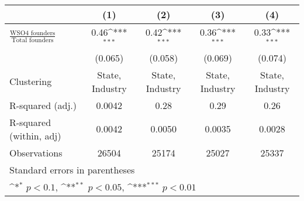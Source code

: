 {
\def\sym#1{\ifmmode^{#1}\else\(^{#1}\)\fi}
\begin{tabular}{l*{4}{c}}
\toprule
                    &\multicolumn{1}{c}{(1)}         &\multicolumn{1}{c}{(2)}         &\multicolumn{1}{c}{(3)}         &\multicolumn{1}{c}{(4)}         \\
\midrule
$\frac{\text{WSO4 founders}}{\text{Total founders}}$&        0.46\sym{***}&        0.42\sym{***}&        0.36\sym{***}&        0.33\sym{***}\\
                    &     (0.065)         &     (0.058)         &     (0.069)         &     (0.074)         \\
\midrule
Clustering          &State, Industry         &State, Industry         &State, Industry         &State, Industry         \\
R-squared (adj.)    &      0.0042         &        0.28         &        0.29         &        0.26         \\
R-squared (within, adj)&      0.0042         &      0.0050         &      0.0035         &      0.0028         \\
Observations        &       26504         &       25174         &       25027         &       25337         \\
\bottomrule
\multicolumn{5}{l}{\tiny Standard errors in parentheses}\\
\multicolumn{5}{l}{\tiny \sym{*} \(p<0.1\), \sym{**} \(p<0.05\), \sym{***} \(p<0.01\)}\\
\end{tabular}
}
